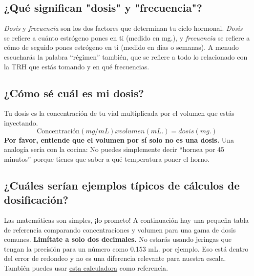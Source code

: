 \documentclass{article}
\begin{document}
\subsection{¿Qué significan "dosis" y "frecuencia"?}

\textit{Dosis} y \textit{frecuencia} son los dos factores que determinan tu ciclo hormonal. \textit{Dosis} se refiere a cuánto estrógeno pones en ti (medido en mg.), y \textit{frecuencia} se refiere a cómo de seguido pones estrógeno en ti (medido en días o semanas). A menudo escucharás la palabra “régimen” también, que se refiere a todo lo relacionado con la TRH que estás tomando y en qué frecuencias.

\subsection{¿Cómo sé cuál es mi dosis?}

Tu dosis es la concentración de tu vial multiplicada por el volumen que estás inyectando. \[\mbox{Concentración} (mg/mL) x volumen (mL.) = dosis (mg.)\] \textbf{Por favor, entiende que el volumen por sí solo no es una dosis.} Una analogía sería con la cocina: No puedes simplemente decir “hornea por 45 minutos” porque tienes que saber a qué temperatura poner el horno.

\subsection{¿Cuáles serían ejemplos típicos de cálculos de dosificación?}

Las matemáticas son simples, ¡lo prometo! A continuación hay una pequeña tabla de referencia comparando concentraciones y volumen para una gama de dosis comunes. \textbf{Limítate a solo dos decimales.} No estarás usando jeringas que tengan la precisión para un número como 0.153 mL. por ejemplo. Eso está dentro del error de redondeo y no es una diferencia relevante para nuestra escala. También puedes usar \href{https://web.archive.org/web/20260307075103/https://hrtcafe.net/Calc/}{esta calculadora} como referencia.
\end{document}
